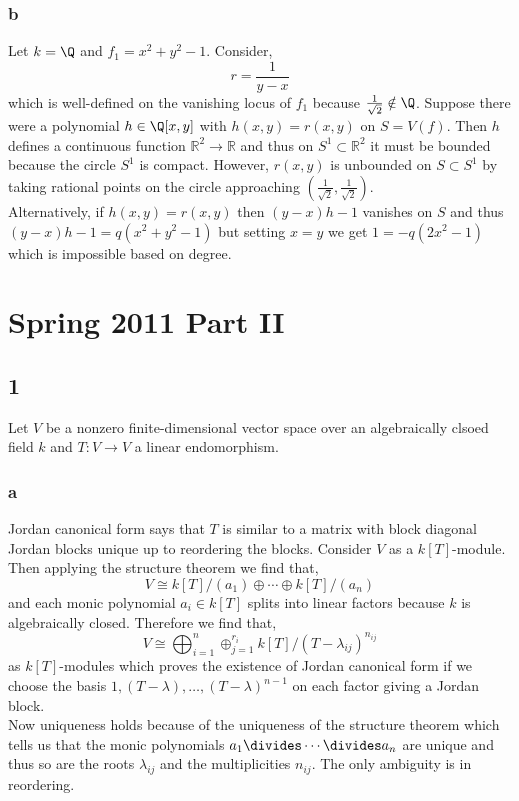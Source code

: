 \documentclass[12pt]{article}
\newcommand{\R}{\mathbb{R}}
\begin{document}
\subsubsection{b}

Let $k = \Q$ and $f_1 = x^2 + y^2 - 1$. Consider,
\[ r = \frac{1}{y - x} \]
which is well-defined on the vanishing locus of $f_1$ because $\frac{1}{\sqrt{2}} \notin \Q$. Suppose there were a polynomial $h \in \Q[x,y]$ with $h(x,y) = r(x,y)$ on $S = V(f)$. Then $h$ defines a continuous function $\R^2 \to \R$ and thus on $S^1 \subset \R^2$ it must be bounded because the circle $S^1$ is compact. However, $r(x,y)$ is unbounded on $S \subset S^1$ by taking rational points on the circle approaching $(\frac{1}{\sqrt{2}}, \frac{1}{\sqrt{2}})$. 
\bigskip\\
Alternatively, if $h(x,y) = r(x,y)$ then $(y - x) h - 1$ vanishes on $S$ and thus $(y - x) h - 1 = q (x^2 + y^2 - 1)$ but setting $x = y$ we get $1 = - q(2 x^2 - 1)$ which is impossible based on degree. 

\section{Spring 2011 Part II}

\subsection{1}

Let $V$ be a nonzero finite-dimensional vector space over an algebraically clsoed field $k$ and $T : V \to V$ a linear endomorphism.

\subsubsection{a}

Jordan canonical form says that $T$ is similar to a matrix with block diagonal Jordan blocks unique up to reordering the blocks. Consider $V$ as a $k[T]$-module. Then applying the structure theorem we find that,
\[ V \cong k[T]/(a_1) \oplus \cdots \oplus k[T]/(a_n) \]
and each monic polynomial $a_i \in k[T]$ splits into linear factors because $k$ is algebraically closed. Therefore we find that,
\[ V \cong \bigoplus_{i = 1}^n \oplus_{j = 1}^{r_i} k[T]/(T - \lambda_{ij})^{n_{ij}} \]
as $k[T]$-modules which proves the existence of Jordan canonical form if we choose the basis $1, (T-\lambda), \dots, (T-\lambda)^{n-1}$ on each factor giving a Jordan block.
\bigskip\\
Now uniqueness holds because of the uniqueness of the structure theorem which tells us that the monic polynomials $a_1 \divides \cdots \divides a_n$ are unique and thus so are the roots $\lambda_{ij}$ and the multiplicities $n_{ij}$. The only ambiguity is in reordering.
\end{document}
